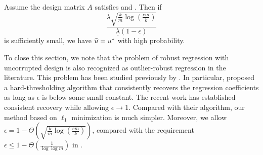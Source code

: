 \begin{thm}\label{thm:robust-reg}
Assume the design matrix $A$ satisfies \conditionAp{} and \conditionB. Then if $$\frac{\overline{\lambda}\sqrt{\frac{k}{m}\log\left(\frac{em}{k}\right)}}{\underline{\lambda}(1-\epsilon)}$$
is sufficiently small, we have $\widehat{u}=u^*$ with high probability.
\end{thm}

To close this section, we note that the problem of robust regression with uncorrupted design is also recognized as outlier-robust regression in the literature.
This problem has been studied previously by \cite{tsakonas2014convergence,wright,nguyen1,nguyen2,karmalkar2018compressed}. In particular, \cite{bhatia} proposed a hard-thresholding algorithm that consistently recovers the regression coefficients as long as $\epsilon$ is below some small constant. The recent work \cite{suggala2019adaptive} has established consistent recovery while allowing $\epsilon\rightarrow 1$. Compared with their algorithm, our method based on $\ell_1$ minimization is much simpler. Moreover, we allow $\epsilon=1-\Theta\left(\sqrt{\frac{k}{m}\log\left(\frac{em}{k}\right)}\right)$, compared with the requirement $\epsilon\leq 1-\Theta\left(\frac{1}{\log\log m}\right)$ in \cite{suggala2019adaptive}.
